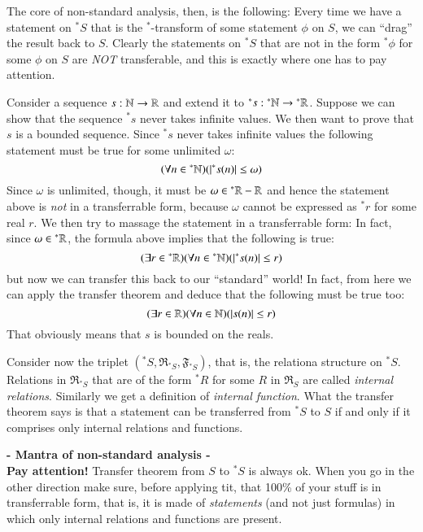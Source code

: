 \documentclass[adraft, copyright,creativecommons,sharealike,noncommercial]{Preambles/eptcs}
\newcommand{\nstar}{{^*}}
\begin{document}
%
The core of non-standard analysis, then, is the following: Every time we have a statement on $\nstar S$ that is the $\nstar$-transform of some statement $\phi$ on $S$, we can ``drag'' the result back to $S$. Clearly the statements on $\nstar S$ that are not in the form $\nstar \phi$ for some $\phi$ on $S$ are \emph{NOT} transferable, and this is exactly where one has to pay attention. 
\begin{example}
	Consider a sequence $s:\mathbb{N} \to \mathbb{R}$ and extend it to $\nstar s:\nstar\naturals \to \nstar\reals$.
	Suppose we can show that the sequence $\nstar s$ never takes infinite values. We then want to prove that $s$ is a bounded sequence. Since $\nstar s$ never takes infinite values the following statement must be true for some unlimited $\omega$:
	\begin{equation*}
		(\forall n \in \nstar\naturals)(|\nstar s(n)| \leq \omega)
	\end{equation*}
	Since $\omega$ is unlimited, though, it must be $\omega \in \nstar \reals - \reals$ and hence the statement above is \emph{not} in a transferrable form, because $\omega$ cannot be expressed as $\nstar r$ for some real $r$. We then try to massage the statement in a transferrable form: In fact, since $\omega \in \nstar \reals$, the formula above implies that the following is true:
	\begin{equation*}
		(\exists r \in \nstar \reals)(\forall n \in \nstar\naturals)(|\nstar s(n)| \leq r)
	\end{equation*}
	but now we can transfer this back to our ``standard'' world! In fact, from here we can apply the transfer theorem and deduce that the following must be true too:
	\begin{equation*}
	(\exists r \in \mathbb{R})(\forall n \in \mathbb{N})(|s(n)| \leq r)
	\end{equation*}	
	That obviously means that $s$ is bounded on the reals.
\end{example}
%
\begin{remark}
	Consider now the triplet $(\nstar S, \mathfrak{R}_{\nstar S}, \mathfrak{F}_{\nstar S})$, that is, the relationa structure on $\nstar S$. Relations in $\mathfrak{R}_{\nstar S}$ that are of the form $\nstar R$ for some $R$ in $\mathfrak{R}_{S}$ are called \emph{internal relations}. Similarly we get a definition of \emph{internal function}. What the transfer theorem says is that a statement can be transferred from $\nstar S$ to $S$ if and only if it comprises only internal relations and functions.
\end{remark}
%
\begin{center}
	\textbf{- Mantra of non-standard analysis -}\\
	\textbf{Pay attention!} Transfer theorem from $S$ to $\nstar S$ is always ok. When you go in the other direction make sure, before applying tit, that 100\% of your stuff is in transferrable form, that is, it is made of \emph{statements} (and not just formulas) in which only internal relations and functions are present.
\end{center}
\end{document}
